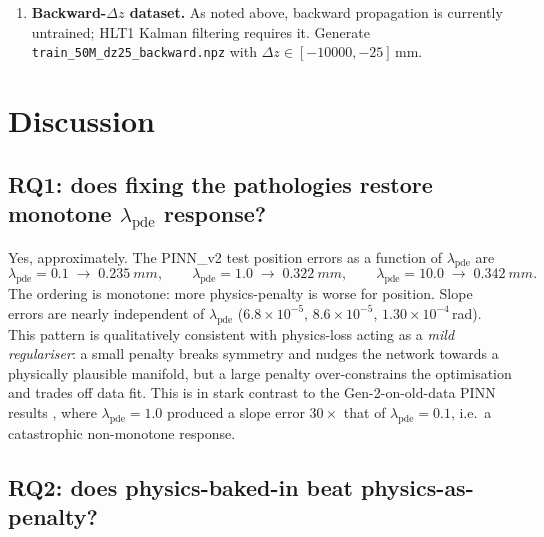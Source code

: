 \documentclass[a4paper,11pt]{article}
\newcommand{\SI}[2]{#1~#2}
\begin{document}
\begin{enumerate}
        not just $B_y$. Current PINN residuals likely assume a
        pure-$y$ field; the LHCb magnet has a $\sim\!20\%$
        $B_x$-component near the fringes, which systematically
        deflects tracks in $y$. Our $\Delta y$ scatter is a decade
        larger for NeuralRK4 at T3 ($\mathrm{std}(\Delta y)\sim
        140\,\mu\mathrm{m}$) than at the UT ($2.6\,\mu\mathrm{m}$)
        even though $\sigma_y^{\mathrm{SciFi}}=500\,\mu\mathrm{m}$
        is huge --- this is compatible with a missing $B_x$ term.
  \item \textbf{Backward-$\Delta z$ dataset.} As noted above,
        backward propagation is currently untrained; HLT1 Kalman
        filtering requires it. Generate
        \texttt{train\_50M\_dz25\_backward.npz} with
        $\Delta z\in[-10000,-25]$\,mm.
\end{enumerate}

\section{Discussion}\label{gen2new:sec:discussion}

\subsection{RQ1: does fixing the pathologies restore monotone
$\lambda_{\mathrm{pde}}$ response?}

Yes, approximately. The PINN\_v2 test position errors as a function
of $\lambda_{\mathrm{pde}}$ are
\[
\lambda_{\mathrm{pde}}=0.1\;\to\;\SI{0.235}{mm},\qquad
\lambda_{\mathrm{pde}}=1.0\;\to\;\SI{0.322}{mm},\qquad
\lambda_{\mathrm{pde}}=10.0\;\to\;\SI{0.342}{mm}.
\]
The ordering is monotone: more physics-penalty is worse for
position. Slope errors are nearly independent of
$\lambda_{\mathrm{pde}}$
($6.8\!\times\!10^{-5}$, $8.6\!\times\!10^{-5}$, $1.30\!\times\!10^{-4}$\,rad).
This pattern is qualitatively consistent with physics-loss acting as
a \emph{mild regulariser}: a small penalty breaks symmetry and nudges
the network towards a physically plausible manifold, but a large
penalty over-constrains the optimisation and trades off data fit.
This is in stark contrast to the Gen-2-on-old-data PINN results
\cite{gen2oldreport}, where $\lambda_{\mathrm{pde}}=1.0$ produced a
slope error $30\times$ that of $\lambda_{\mathrm{pde}}=0.1$, i.e.\ a
catastrophic non-monotone response.

\subsection{RQ2: does physics-baked-in beat physics-as-penalty?}
\end{document}
